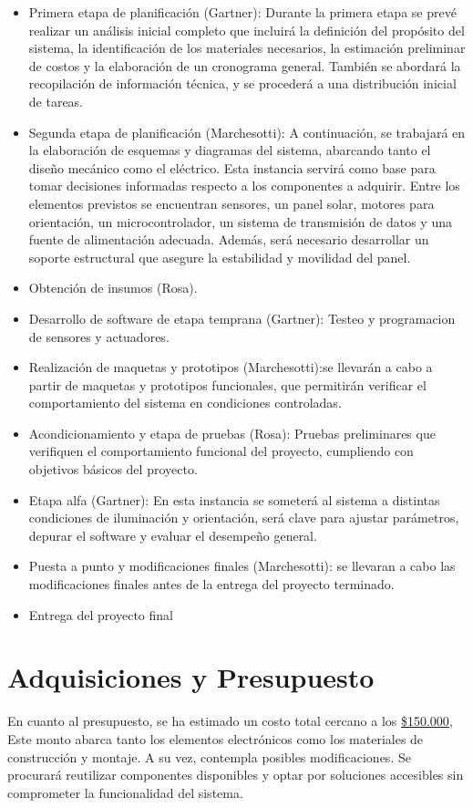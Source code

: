 \documentclass[a4paper,12pt]{article}
\begin{document}
\begin{itemize}
    \item Primera etapa de planificación (Gartner): Durante la primera etapa se prevé realizar un análisis inicial completo que incluirá la definición del propósito del sistema, la identificación de los materiales necesarios, la estimación preliminar de costos y la elaboración de un cronograma general. También se abordará la recopilación de información técnica, y se procederá a una distribución inicial de tareas.
    \item Segunda etapa de planificación (Marchesotti): A continuación, se trabajará en la elaboración de esquemas y diagramas del sistema, abarcando tanto el diseño mecánico como el eléctrico. Esta instancia servirá como base para tomar decisiones informadas respecto a los componentes a adquirir. Entre los elementos previstos se encuentran sensores, un panel solar, motores para orientación, un microcontrolador, un sistema de transmisión de datos y una fuente de alimentación adecuada. Además, será necesario desarrollar un soporte estructural que asegure la estabilidad y movilidad del panel.
    \item Obtención de insumos (Rosa).
    \item Desarrollo de software de etapa temprana (Gartner): Testeo y programacion de sensores y actuadores.
    \item Realización de maquetas y prototipos (Marchesotti):se llevarán a cabo a partir de maquetas y prototipos funcionales, que permitirán verificar el comportamiento del sistema en condiciones controladas.
    \item Acondicionamiento y etapa de pruebas (Rosa): Pruebas preliminares que verifiquen el comportamiento funcional del proyecto, cumpliendo con objetivos básicos del proyecto. 
    \item Etapa alfa (Gartner): En esta instancia se someterá al sistema a distintas condiciones de iluminación y orientación, será clave para ajustar parámetros, depurar el software y evaluar el desempeño general.
    \item Puesta a punto y modificaciones finales (Marchesotti): se llevaran a cabo las modificaciones finales antes de la entrega del proyecto terminado.
    \item Entrega del proyecto final
\end{itemize}

\section{Adquisiciones y Presupuesto}
En cuanto al presupuesto, se ha estimado un costo total cercano a los \hyperref[tabla]{\$150.000}, Este monto abarca tanto los elementos electrónicos como los materiales de construcción y montaje. A su vez, contempla posibles modificaciones. Se procurará reutilizar componentes disponibles y optar por soluciones accesibles sin comprometer la funcionalidad del sistema.\\
\end{document}
